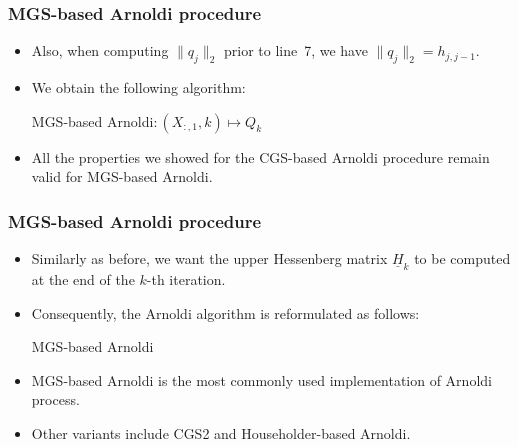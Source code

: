 \documentclass[t,usepdftitle=false]{beamer}
\begin{document}
\begin{frame}
\frametitle{MGS-based Arnoldi procedure}	
\begin{itemize}
\item Also, when computing $\|q_j\|_2$ prior to line~7, we have $\|q_j\|_2=h_{j,j-1}$.
\item We obtain the following algorithm:
\begin{algorithm}[H]
\small
\caption{MGS-based Arnoldi$:(X_{:,1},k)\mapsto Q_k$}
\begin{algorithmic}[1]
\ENDFOR
{}
\ENDFOR
\end{algorithmic}
\end{algorithm}		
\vspace{-.4cm}
\item All the properties we showed for the CGS-based Arnoldi procedure remain valid for MGS-based Arnoldi.
\end{itemize}
\end{frame}   

\begin{frame}
\frametitle{MGS-based Arnoldi procedure}	
\begin{itemize}
\item Similarly as before, we want the upper Hessenberg matrix $\underline{H}_k$ to be computed at the end of the $k$-th iteration.
\item Consequently, the Arnoldi algorithm is reformulated as follows:
\begin{algorithm}[H]
\small
\caption{MGS-based Arnoldi}%
\begin{algorithmic}[1]
\ENDFOR
{}
\ENDFOR
\end{algorithmic}
\end{algorithm}		
\item MGS-based Arnoldi is the most commonly used implementation of Arnoldi process.
\item Other variants include CGS2 and Householder-based Arnoldi.
\end{itemize}
\end{frame}   
\end{document}
